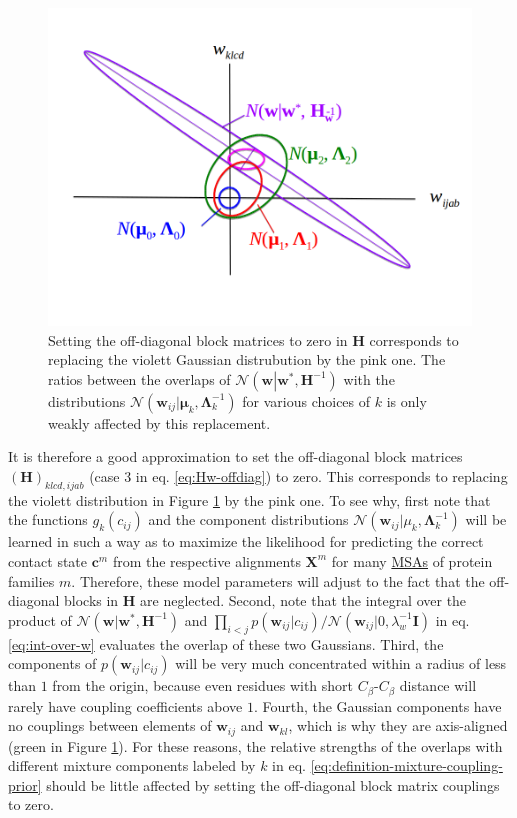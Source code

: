 \documentclass[11pt,a4paper,twoside]{book}
\newcommand{\Gauss}{\mathcal{N}}
\renewcommand{\H}{\mathbf{H}}
\newcommand{\I}{\mathbf{I}}
\newcommand{\Lk}{\mathbf{\Lambda}_k}
\newcommand{\muk}{\mathbf{\mu}_k}
\renewcommand{\c}{\mathbf{c}}
\newcommand{\cij}{c_{ij}}
\newcommand{\w}{\mathbf{w}}
\newcommand{\wij}{\mathbf{w}_{ij}}
\newcommand{\X}{\mathbf{X}}
\theoremstyle{definition}
\theoremstyle{definition}
\theoremstyle{remark}
\begin{document}
\begin{figure}

{\centering \includegraphics[width=0.8\linewidth]{img/theory/hessian-off-diagonal} 

}

\caption{Setting the off-diagonal block
matrices to zero in \(\H\) corresponds to replacing the violett Gaussian
distrubution by the pink one. The ratios between the overlaps of
\(\Gauss\!\left(\w \left| \w^*, \H^{-1} \right. \right)\) with the
distributions \(\Gauss(\wij | \muk, \Lk^{-1})\) for various choices of
\(k\) is only weakly affected by this replacement.}\label{fig:hessian-off-diagonal}
\end{figure}

It is therefore a good approximation to set the off-diagonal block
matrices \((\H)_{klcd, ijab}\) (case 3 in eq. \eqref{eq:Hw-offdiag}) to
zero. This corresponds to replacing the violett distribution in Figure
\ref{fig:hessian-off-diagonal} by the pink one. To see why, first note
that the functions \(g_k(\cij)\) and the component distributions
\(\Gauss(\wij | \mu_k, \Lk^{-1})\) will be learned in such a way as to
maximize the likelihood for predicting the correct contact state
\(\c^m\) from the respective alignments \(\X^m\) for many
\protect\hyperlink{abbrev}{MSAs} of protein families \(m\). Therefore,
these model parameters will adjust to the fact that the off-diagonal
blocks in \(\H\) are neglected. Second, note that the integral over the
product of \(\Gauss(\w | \w^*, \H^{-1})\) and
\(\prod_{i<j} p(\wij | \cij) / \Gauss(\wij| 0, \lambda_w^{-1} \I)\) in
eq. \eqref{eq:int-over-w} evaluates the overlap of these two Gaussians.
Third, the components of \(p(\wij|\cij)\) will be very much concentrated
within a radius of less than \(1\) from the origin, because even
residues with short \(C_\beta\)-\(C_\beta\) distance will rarely have
coupling coefficients above \(1\). Fourth, the Gaussian components have
no couplings between elements of \(\wij\) and \(\w_{kl}\), which is why
they are axis-aligned (green in Figure \ref{fig:hessian-off-diagonal}).
For these reasons, the relative strengths of the overlaps with different
mixture components labeled by \(k\) in eq.
\eqref{eq:definition-mixture-coupling-prior} should be little affected by
setting the off-diagonal block matrix couplings to zero.
\end{document}
